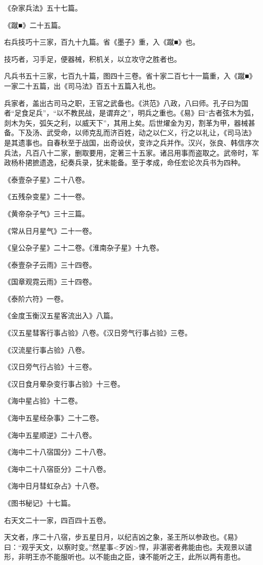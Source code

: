 \documentclass[]{article}
\begin{document}
《杂家兵法》五十七篇。

《蹴■》二十五篇。

右兵技巧十三家，百九十九篇。省《墨子》重，入《蹴■》也。

技巧者，习手足，便器械，积机关，以立攻守之胜者也。

凡兵书五十三家，七百九十篇，图四十三卷。省十家二百七十一篇重，入《蹴■》一家二十五篇，出《司马法》百五十五篇入礼也。

兵家者，盖出古司马之职，王官之武备也。《洪范》八政，八曰师。孔子曰为国者``足食足兵''，``以不教民战，是谓弃之''，明兵之重也。《易》曰``古者弦木为弧，剡木为矢，弧矢之利，以威天下''，其用上矣。后世燿金为刃，割革为甲，器械甚备。下及汤、武受命，以师克乱而济百姓，动之以仁义，行之以礼让，《司马法》是其遗事也。自春秋至于战国，出奇设伏，变诈之兵并作。汉兴，张良、韩信序次兵法，凡百八十二家，删取要用，定著三十五家。诸吕用事而盗取之。武帝时，军政杨朴捃摭遗逸，纪奏兵录，犹未能备。至于孝成，命任宏论次兵书为四种。

《泰壹杂子星》二十八卷。

《五残杂变星》二十一卷。

《黄帝杂子气》三十三篇。

《常从日月星气》二十一卷。

《皇公杂子星》二十二卷。《淮南杂子星》十九卷。

《泰壹杂子云雨》三十四卷。

《国章观霓云雨》三十四卷。

《泰阶六符》一卷。

《金度玉衡汉五星客流出入》八篇。

《汉五星彗客行事占验》八卷。《汉日旁气行事占验》三卷。

《汉流星行事占验》八卷。

《汉日旁气行占验》十三卷。

《汉日食月晕杂变行事占验》十三卷。

《海中星占验》十二卷。

《海中五星经杂事》二十二卷。

《海中五星顺逆》二十八卷。

《海中二十八宿国分》二十八卷。

《海中二十八宿臣分》二十八卷。

《海中日月彗虹杂占》十八卷。

《图书秘记》十七篇。

右天文二十一家，四百四十五卷。

天文者，序二十八宿，步五星日月，以纪吉凶之象，圣王所以参政也。《易》曰：``观乎天文，以察时变。''然星事\textless{}歹凶\textgreater{}悍，非湛密者弗能由也。夫观景以谴形，非明王亦不能服听也。以不能由之臣，谏不能听之王，此所以两有患也。
\end{document}

